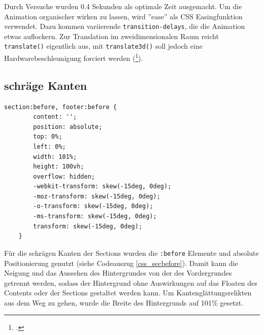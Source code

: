 Durch Versuche wurden 0.4 Sekunden als optimale Zeit ausgemacht. Um die Animation organischer wirken zu lassen, wird ''ease'' als CSS Easingfunktion verwendet. Dazu kommen variierende \lstinline{transition-delays}, die die Animation etwas auflockern.
Zur Translation im zweidimensionalen Raum reicht \lstinline{translate()} eigentlich aus, mit \lstinline{translate3d()} soll jedoch eine Hardwarebeschleunigung forciert werden (\footcite[vgl.][]{css3D}).

\subsection{schräge Kanten}
\begin{lstlisting}[caption=Der Hintergrund der Section als Container., label=css_secbefore]
section:before, footer:before {
        content: '';
        position: absolute;
        top: 0%;
        left: 0%;
        width: 101%;
        height: 100vh;
        overflow: hidden;
        -webkit-transform: skew(-15deg, 0deg);
        -moz-transform: skew(-15deg, 0deg);
        -o-transform: skew(-15deg, 0deg);
        -ms-transform: skew(-15deg, 0deg);
        transform: skew(-15deg, 0deg);
    }
\end{lstlisting}

Für die schrägen Kanten der Sections wurden die \lstinline{:before} Elemente und absolute Positionierung genutzt (siehe Codeauszug \ref{css_secbefore}). Damit kann die Neigung und das Aussehen des Hintergrundes von der des Vordergrundes getrennt werden, sodass der Hintergrund ohne Auswirkungen auf das Floaten des Contents oder der Sections gestaltet werden kann. Um Kantenglättungsrelikten aus dem Weg zu gehen, wurde die Breite des Hintergrunds auf 101\% gesetzt.
